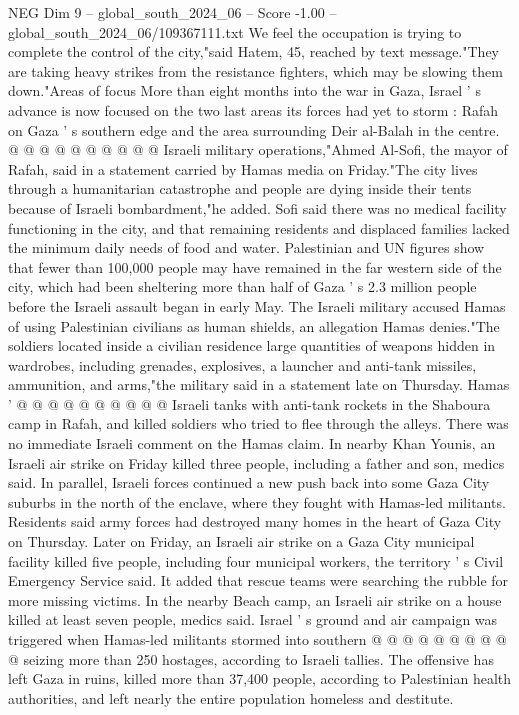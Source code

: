 \begin{textsample}{NEG Dim 9 – global\_south\_2024\_06 – Score -1.00 – global\_south\_2024\_06/109367111.txt}
We feel the occupation is trying to complete the control of the city,"said Hatem, 45, reached by text message."They are taking heavy strikes from the resistance fighters, which may be slowing them down."Areas of focus More than eight months into the war in Gaza, Israel ' s advance is now focused on the two last areas its forces had yet to storm : Rafah on Gaza ' s southern edge and the area surrounding Deir al-Balah in the centre. @ @ @ @ @ @ @ @ @ @ Israeli military operations,"Ahmed Al-Sofi, the mayor of Rafah, said in a statement carried by Hamas media on Friday."The city lives through a humanitarian catastrophe and people are dying inside their tents because of Israeli bombardment,"he added.
Sofi said there was no medical facility functioning in the city, and that remaining residents and displaced families lacked the minimum daily needs of food and water.
Palestinian and UN figures show that fewer than 100,000 people may have remained in the far western side of the city, which had been sheltering more than half of Gaza ' s 2.3 million people before the Israeli assault began in early May.
The Israeli military accused Hamas of using Palestinian civilians as human shields, an allegation Hamas denies."The soldiers located inside a civilian residence large quantities of weapons hidden in wardrobes, including grenades, explosives, a launcher and anti-tank missiles, ammunition, and arms,"the military said in a statement late on Thursday.
Hamas ' @ @ @ @ @ @ @ @ @ @ Israeli tanks with anti-tank rockets in the Shaboura camp in Rafah, and killed soldiers who tried to flee through the alleys.
There was no immediate Israeli comment on the Hamas claim.
In nearby Khan Younis, an Israeli air strike on Friday killed three people, including a father and son, medics said.
In parallel, Israeli forces continued a new push back into some Gaza City suburbs in the north of the enclave, where they fought with Hamas-led militants.
Residents said army forces had destroyed many homes in the heart of Gaza City on Thursday.
Later on Friday, an Israeli air strike on a Gaza City municipal facility killed five people, including four municipal workers, the territory ' s Civil Emergency Service said.
It added that rescue teams were searching the rubble for more missing victims.
In the nearby Beach camp, an Israeli air strike on a house killed at least seven people, medics said.
Israel ' s ground and air campaign was triggered when Hamas-led militants stormed into southern @ @ @ @ @ @ @ @ @ @ seizing more than 250 hostages, according to Israeli tallies.
The offensive has left Gaza in ruins, killed more than 37,400 people, according to Palestinian health authorities, and left nearly the entire population homeless and destitute.

\end{textsample}
